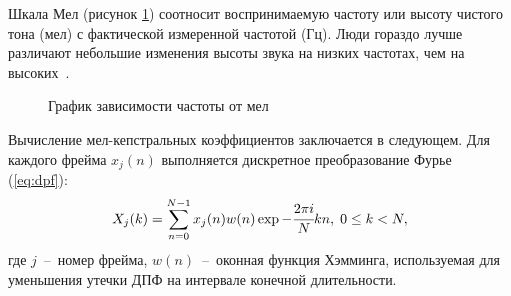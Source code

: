 Шкала Мел (рисунок \ref{fig:mel-hz}) соотносит воспринимаемую частоту или высоту чистого тона (мел) с фактической измеренной частотой (Гц). Люди гораздо лучше различают небольшие изменения высоты звука на низких частотах, чем на высоких~\cite{mel}.
\begin{figure}[H]
	\centering
	\caption{График зависимости частоты от мел}
	\label{fig:mel-hz}
\end{figure}

Вычисление мел-кепстральных коэффициентов заключается в следующем. Для каждого фрейма $x_j(n)$ выполняется дискретное преобразование Фурье (\ref{eq:dpf}):
\begin{equation}\label{eq:dpf}
	X_j(k) = \displaystyle\sum_{n = 0}^{N-1} x_j(n)w(n)\exp{-\cfrac{2\pi i}{N}kn},\;0 \leq k < N,
\end{equation}
где $j$~--~номер фрейма, $w(n)$~--~оконная функция Хэмминга, используемая для уменьшения утечки ДПФ на интервале конечной длительности. 

